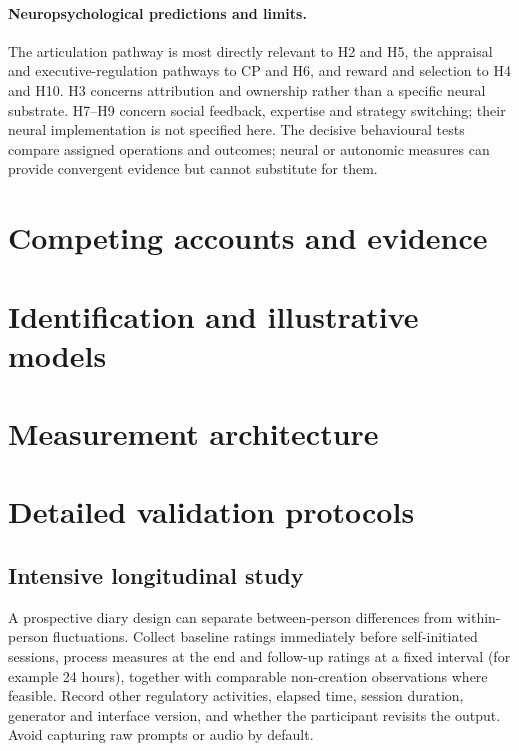 \documentclass[11pt,a4paper]{article}
\begin{document}
\paragraph{Neuropsychological predictions and limits.} The articulation pathway is most directly relevant to H2 and H5, the appraisal and executive-regulation pathways to CP and H6, and reward and selection to H4 and H10. H3 concerns attribution and ownership rather than a specific neural substrate. H7--H9 concern social feedback, expertise and strategy switching; their neural implementation is not specified here. The decisive behavioural tests compare assigned operations and outcomes; neural or autonomic measures can provide convergent evidence but cannot substitute for them.


\section{Competing accounts and evidence}


\section{Identification and illustrative models}


\section{Measurement architecture}


\section{Detailed validation protocols}
\subsection{Intensive longitudinal study}
A prospective diary design can separate between-person differences from within-person fluctuations. Collect baseline ratings immediately before self-initiated sessions, process measures at the end and follow-up ratings at a fixed interval (for example 24 hours), together with comparable non-creation observations where feasible. Record other regulatory activities, elapsed time, session duration, generator and interface version, and whether the participant revisits the output. Avoid capturing raw prompts or audio by default.
\end{document}
